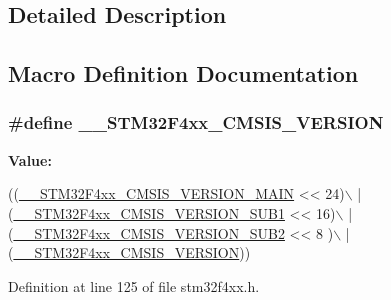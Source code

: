 \subsection{Detailed Description}


\subsection{Macro Definition Documentation}
\subsubsection[{\texorpdfstring{\+\_\+\+\_\+\+S\+T\+M32\+F4xx\+\_\+\+C\+M\+S\+I\+S\+\_\+\+V\+E\+R\+S\+I\+ON}{__STM32F4xx_CMSIS_VERSION}}]{\setlength{\rightskip}{0pt plus 5cm}\#define \+\_\+\+\_\+\+S\+T\+M32\+F4xx\+\_\+\+C\+M\+S\+I\+S\+\_\+\+V\+E\+R\+S\+I\+ON}\hypertarget{group___library__configuration__section_ga9e8a65cc42b85335938665a12c37cacf}{}\label{group___library__configuration__section_ga9e8a65cc42b85335938665a12c37cacf}
{\bfseries Value\+:}
\begin{DoxyCode}
((\hyperlink{group___library__configuration__section_gaf867da11218022a14245b854f6be6a40}{\_\_STM32F4xx\_CMSIS\_VERSION\_MAIN} << 24)\(\backslash\)
                                         |(\hyperlink{group___library__configuration__section_ga4841e20bc5159a594936808c113ae3bc}{\_\_STM32F4xx\_CMSIS\_VERSION\_SUB1} << 
      16)\(\backslash\)
                                         |(\hyperlink{group___library__configuration__section_ga6ccbf6336bfb67bf4daeb05eba18a5e3}{\_\_STM32F4xx\_CMSIS\_VERSION\_SUB2} << 
      8 )\(\backslash\)
                                         |(\hyperlink{group___library__configuration__section_ga9e8a65cc42b85335938665a12c37cacf}{\_\_STM32F4xx\_CMSIS\_VERSION}))
\end{DoxyCode}


Definition at line 125 of file stm32f4xx.\+h.

